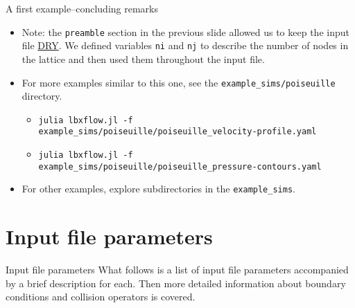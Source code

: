 \documentclass[pdf]{beamer}
\begin{document}
\begin{frame}{A first example--concluding remarks}
  \begin{itemize}
    \item <1-> Note: the \texttt{preamble} section in the previous slide allowed us to keep the input file \href{https://en.wikipedia.org/wiki/Don\%27t\_repeat\_yourself}{DRY}.
  We defined variables \texttt{ni} and \texttt{nj} to describe the number of nodes in the lattice and then used them throughout the input file.
\item <2-> For more examples similar to this one, see the \texttt{example\_sims/poiseuille} directory.
  \begin{itemize}
      \tiny
    \item \texttt{julia lbxflow.jl -f example\_sims/poiseuille/poiseuille\_velocity-profile.yaml}
    \item \texttt{julia lbxflow.jl -f example\_sims/poiseuille/poiseuille\_pressure-contours.yaml}
  \end{itemize}
\item <3-> For other examples, explore subdirectories in the \texttt{example\_sims}.
  \end{itemize}
\end{frame}

\section{Input file parameters}

\begin{frame}{Input file parameters}
  What follows is a list of input file parameters accompanied by a brief description for each.
  Then more detailed information about boundary conditions and collision operators is covered.
\end{frame}
\end{document}
